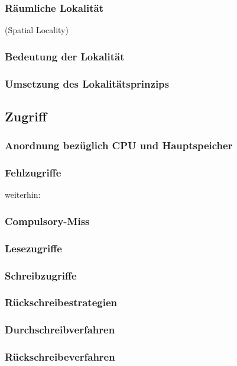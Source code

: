 \subsubsection{Räumliche Lokalität}
(Spatial Locality)

\subsubsection{Bedeutung der Lokalität}

\subsubsection{Umsetzung des Lokalitätsprinzips}

\subsection{Zugriff}
\subsubsection{Anordnung bezüglich CPU und Hauptspeicher}
\subsubsection{Fehlzugriffe}
weiterhin:
\subsubsection*{Compulsory-Miss}

\subsubsection{Lesezugriffe}

\subsubsection{Schreibzugriffe}
\subsubsection*{Rückschreibestrategien}
\subsubsection*{Durchschreibverfahren}
\subsubsection*{Rückschreibeverfahren}
